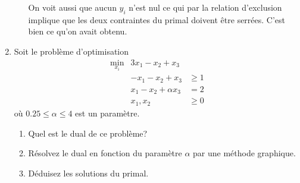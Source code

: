 \begin{enumerate}
\begin{solution}
\begin{enumerate}
          On voit aussi que aucun $y_i$ n'est nul ce qui par la relation
          d'exclusion implique que les deux contraintes du primal
          doivent être serrées. C'est bien ce qu'on avait obtenu.
      \end{enumerate}
    \end{solution}

  \item Soit le problème d'optimisation
    \begin{eqnarray*}
      \min_{x_i} & 3 x_1- x_2+ x_3 &  \\
      &-x_1 -x_2+ x_3  &\ge 1 \\
      &x_1- x_2 +\alpha x_3  &= 2 \\
      &x_1, x_2 &\ge 0
    \end{eqnarray*}
    où  $0.25\le\alpha\le4$ est un paramètre.
    \begin{enumerate}
      \item Quel est le dual de ce problème?
      \item Résolvez le dual en fonction
        du paramètre $\alpha$ par une méthode graphique.
      \item Déduisez les solutions du primal.
    \end{enumerate}



\end{enumerate}
